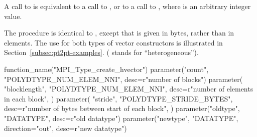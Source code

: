 A call to  is
equivalent to a call to
, or to a call to
, where 
is an arbitrary integer value.

The procedure
is identical to
, except that  is given in bytes,
rather than in elements.  The use for both types of vector
constructors is illustrated in Section~\ref{subsec:pt2pt-examples}.
( stands for ``heterogeneous'').


%
\begin{mpi-binding}
    function_name("MPI_Type_create_hvector")
    parameter("count", "POLYDTYPE_NUM_ELEM_NNI", desc=r"number of blocks")
    parameter(
        "blocklength",
        "POLYDTYPE_NUM_ELEM_NNI",
        desc=r"number of elements in each block",
    )
    parameter(
        "stride",
        "POLYDTYPE_STRIDE_BYTES",
        desc=r"number of bytes between start of each block",
    )
    parameter("oldtype", "DATATYPE", desc=r"old datatype")
    parameter("newtype", "DATATYPE", direction="out", desc=r"new datatype")
\end{mpi-binding}

